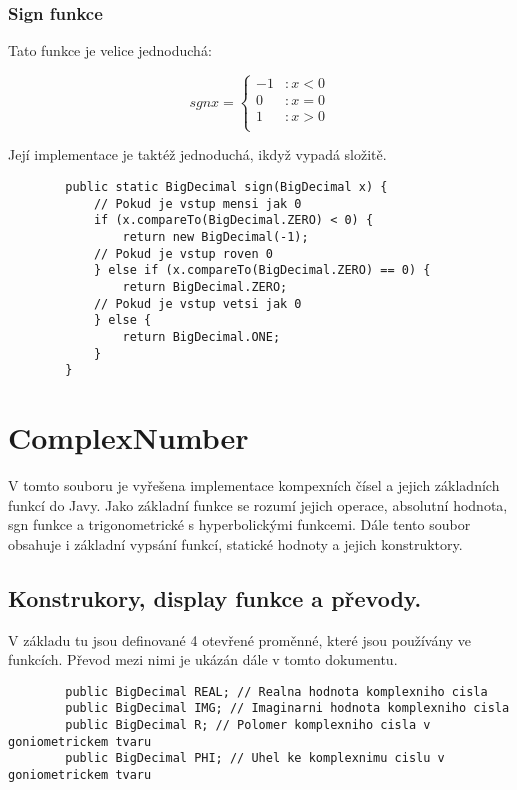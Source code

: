\documentclass{article}
\begin{document}
    \subsubsection{Sign funkce}
    Tato funkce je velice jednoduchá:
    \begin{center}
        \begin{equation*}
            sgn x = \begin{cases}
                -1 & \text{$: x < 0$}\\
                0 & \text{$: x = 0$}\\
                1 & \text{$: x > 0$}\\
            \end{cases}
        \end{equation*}
    \end{center}
    Její implementace je taktéž jednoduchá, ikdyž vypadá složitě.
    \begin{lstlisting}
        public static BigDecimal sign(BigDecimal x) {
            // Pokud je vstup mensi jak 0
            if (x.compareTo(BigDecimal.ZERO) < 0) {
                return new BigDecimal(-1);
            // Pokud je vstup roven 0
            } else if (x.compareTo(BigDecimal.ZERO) == 0) {
                return BigDecimal.ZERO;
            // Pokud je vstup vetsi jak 0
            } else {
                return BigDecimal.ONE;
            }
        }
    \end{lstlisting}
    \newpage
    \section{ComplexNumber}
    V tomto souboru je vyřešena implementace kompexních čísel a jejich základních funkcí do Javy. Jako
    základní funkce se rozumí jejich operace, absolutní hodnota, sgn funkce a trigonometrické s hyperbolickými funkcemi. Dále
    tento soubor obsahuje i základní vypsání funkcí, statické hodnoty a jejich konstruktory.
    \subsection{Konstrukory, display funkce a převody.}
    V základu tu jsou definované 4 otevřené proměnné, které jsou používány ve funkcích. Převod mezi nimi je
    ukázán dále v tomto dokumentu.
    \begin{lstlisting}
        public BigDecimal REAL; // Realna hodnota komplexniho cisla
        public BigDecimal IMG; // Imaginarni hodnota komplexniho cisla
        public BigDecimal R; // Polomer komplexniho cisla v goniometrickem tvaru
        public BigDecimal PHI; // Uhel ke komplexnimu cislu v goniometrickem tvaru
    \end{lstlisting}
\end{document}
